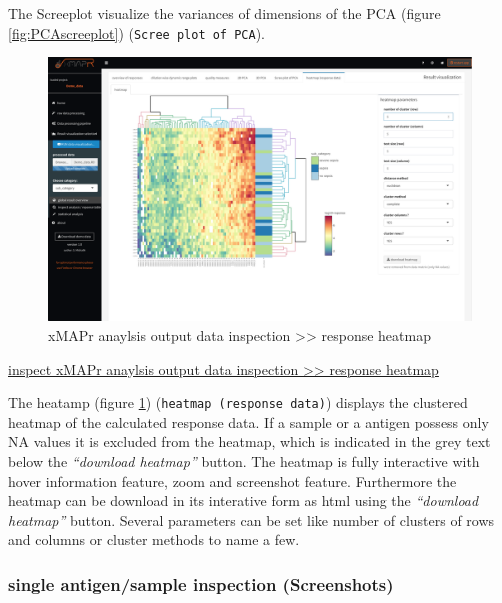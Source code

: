 \documentclass[
]{book}
\begin{document}
The Screeplot visualize the variances of dimensions of the PCA (figure \ref{fig:PCAscreeplot}) (\texttt{Scree\ plot\ of\ PCA}).

\begin{figure}
\includegraphics[width=50.47in]{figures/response_heatmap} \caption{xMAPr anaylsis output data inspection >> response heatmap}\label{fig:responseHeatmap}
\end{figure}

\href{figures/response_heatmap.png}{inspect xMAPr anaylsis output data inspection \textgreater\textgreater{} response heatmap}

The heatamp (figure \ref{fig:responseHeatmap}) (\texttt{heatmap\ (response\ data)}) displays the clustered heatmap of the calculated response data. If a sample or a antigen possess only NA values it is excluded from the heatmap, which is indicated in the grey text below the \emph{``download heatmap''} button. The heatmap is fully interactive with hover information feature, zoom and screenshot feature. Furthermore the heatmap can be download in its interative form as html using the \emph{``download heatmap''} button. Several parameters can be set like number of clusters of rows and columns or cluster methods to name a few.

\subsubsection{single antigen/sample inspection (Screenshots)}\label{single-antigensample-inspection-screenshots}
\end{document}
